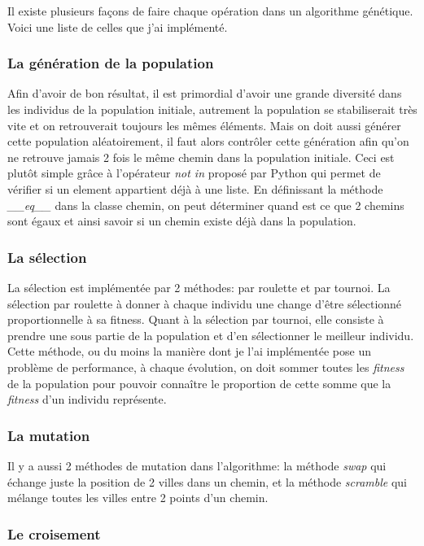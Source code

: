 \documentclass[12pt]{article}
\begin{document}
Il existe plusieurs façons de faire chaque opération dans un algorithme génétique. Voici une liste de celles que j'ai
implémenté.

\subsubsection*{La génération de la population}

Afin d'avoir de bon résultat, il est primordial d'avoir une grande diversité dans les individus de la population initiale,
autrement la population se stabiliserait très vite et on retrouverait toujours les mêmes éléments.
Mais on doit aussi générer cette population aléatoirement, il faut alors contrôler cette génération afin qu'on ne retrouve
jamais 2 fois le même chemin dans la population initiale. Ceci est plutôt simple grâce à l'opérateur \emph{not in}
proposé par Python qui permet de vérifier si un element appartient déjà à une liste. En définissant la méthode \emph{\_\_eq\_\_}
dans la classe chemin, on peut déterminer quand est ce que 2 chemins sont égaux et ainsi savoir si un chemin existe déjà dans
la population.

\subsubsection*{La sélection}

La sélection est implémentée par 2 méthodes: par roulette et par tournoi. La sélection par
roulette à donner à chaque individu une change d'être sélectionné proportionnelle à sa
fitness. Quant à la sélection par tournoi, elle consiste à prendre une sous partie
de la population et d'en sélectionner le meilleur individu. Cette méthode, ou du moins la manière dont je l'ai
implémentée pose un problème de performance, à chaque évolution, on doit sommer toutes les \emph{fitness} de la population
pour pouvoir connaître le proportion de cette somme que la \emph{fitness} d'un individu représente.

\subsubsection*{La mutation}

Il y a aussi 2 méthodes de mutation dans l'algorithme: la méthode \emph{swap} qui échange juste
la position de 2 villes dans un chemin, et la méthode \emph{scramble} qui mélange toutes les villes
entre 2 points d'un chemin.

\subsubsection*{Le croisement}
\end{document}
